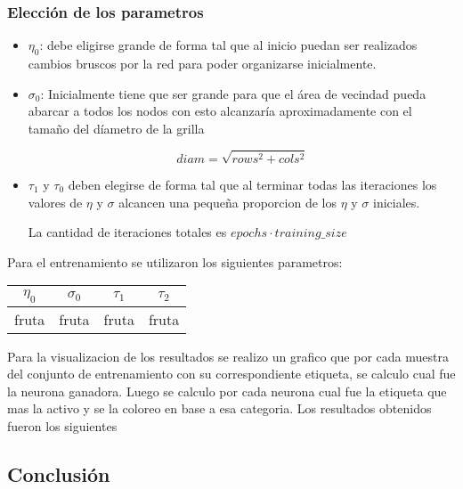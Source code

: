 \subsubsection{Elección de los parametros}
\begin{itemize}
	\item $\eta_0$: debe eligirse grande de forma tal que al inicio
puedan ser realizados cambios bruscos por la red para 
poder organizarse inicialmente.

	\item $\sigma_0$: Inicialmente tiene que ser grande para que el área
de vecindad pueda abarcar a todos los nodos con esto alcanzaría aproximadamente
con el tamaño del díametro de la grilla

\[
	diam = \sqrt{rows^2+cols^2}
\]
	\item $\tau_1$ y $\tau_0$ deben elegirse de forma tal que al terminar
	todas las iteraciones los valores de $\eta$ y $\sigma$ alcancen
	una pequeña proporcion de los $\eta$ y $\sigma$ iniciales.

	La cantidad de iteraciones totales es $epochs \cdot training\_size $

\end{itemize}


Para el entrenamiento se utilizaron los siguientes parametros:
\begin{center}
  \begin{tabular}{|c|c|c|c|}
    \hline
    $\eta_0$ & $\sigma_0$ & $\tau_1$ & $\tau_2$ \\
    \hline
    fruta  & fruta & fruta & fruta \\
    \hline
  \end{tabular}
\end{center}

Para la visualizacion de los resultados se realizo un grafico que por cada muestra del conjunto de entrenamiento
 con su correspondiente etiqueta, se calculo cual fue la neurona ganadora. Luego se calculo por cada neurona cual fue la etiqueta
 que mas la activo y se la coloreo en base a esa categoria.
Los resultados obtenidos fueron los siguientes
\subsection{Conclusión}

